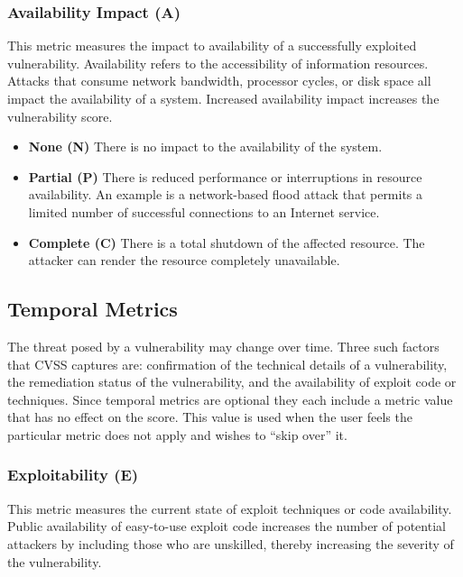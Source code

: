   \subsubsection{Availability Impact (A)}\label{availability-impact-a}

  This metric measures the impact to availability of a successfully
  exploited vulnerability. Availability refers to the accessibility of
  information resources. Attacks that consume network bandwidth, processor
  cycles, or disk space all impact the availability of a system. Increased
  availability impact increases the vulnerability score.

  \begin{itemize}
  \item
    \textbf{None (N)} There is no impact to the availability of the
    system.
  \item
    \textbf{Partial (P)} There is reduced performance or interruptions in
    resource availability. An example is a network-based flood attack that
    permits a limited number of successful connections to an Internet
    service.
  \item
    \textbf{Complete (C)} There is a total shutdown of the affected
    resource. The attacker can render the resource completely unavailable.
  \end{itemize}

  \subsection{Temporal Metrics}\label{temporal-metrics}

  The threat posed by a vulnerability may change over time. Three such
  factors that CVSS captures are: confirmation of the technical details of
  a vulnerability, the remediation status of the vulnerability, and the
  availability of exploit code or techniques. Since temporal metrics are
  optional they each include a metric value that has no effect on the
  score. This value is used when the user feels the particular metric does
  not apply and wishes to ``skip over'' it.

  \subsubsection{Exploitability (E)}\label{exploitability-e}

  This metric measures the current state of exploit techniques or code
  availability. Public availability of easy-to-use exploit code increases
  the number of potential attackers by including those who are unskilled,
  thereby increasing the severity of the vulnerability.

